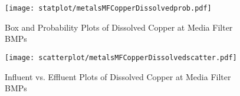         \begin{figure}[hb]   %
            \centering
            \texttt{[image: statplot/metalsMFCopperDissolvedprob.pdf]}
            \caption{Box and Probability Plots of Dissolved Copper at Media Filter BMPs}
        \end{figure}         %
        
        
        \begin{figure}[hb]   %
            \centering
            \texttt{[image: scatterplot/metalsMFCopperDissolvedscatter.pdf]}
            \caption{Influent vs. Effluent Plots of Dissolved Copper at Media Filter BMPs}
        \end{figure}         %
        \clearpage
        